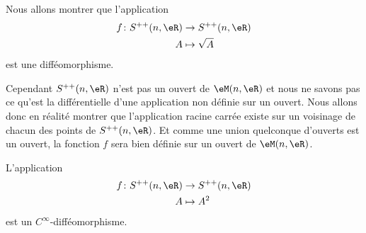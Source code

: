 \begin{normaltext}      \label{NomDJMUooTRUVkS}
	Nous allons montrer que l'application
	\begin{equation}
		\begin{aligned}
			f\colon S^{++}(n,\eR) & \to S^{++}(n,\eR) \\
			A                     & \mapsto \sqrt{A}
		\end{aligned}
	\end{equation}
	est une difféomorphisme.

	Cependant \( S^{++}(n,\eR)\) n'est pas un ouvert de \( \eM(n,\eR)\) et nous ne savons pas ce qu'est la différentielle d'une application non définie sur un ouvert. Nous allons donc en réalité montrer que l'application racine carrée existe sur un voisinage de chacun des points de \( S^{++}(n,\eR)\). Et comme une union quelconque d'ouverts est un ouvert, la fonction \( f\) sera bien définie sur un ouvert de \( \eM(n,\eR)\).
\end{normaltext}

\begin{lemma}       \label{LemLBFOooDdNcgy}
	L'application
	\begin{equation}
		\begin{aligned}
			f\colon S^{++}(n,\eR) & \to S^{++}(n,\eR) \\
			A                     & \mapsto A^2
		\end{aligned}
	\end{equation}
	est un \( C^{\infty}\)-difféomorphisme.
\end{lemma}

